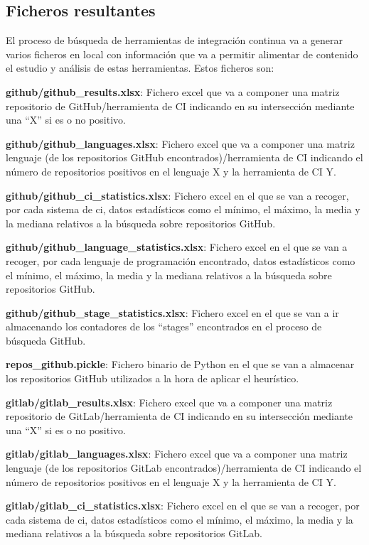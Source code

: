 \subsection{Ficheros resultantes}
El proceso de búsqueda de herramientas de integración continua va a generar varios ficheros en local con información que va a permitir alimentar de contenido el estudio y análisis de estas herramientas. Estos ficheros son:
\begin{compactitem}
    \item \textbf{github/github\_results.xlsx}: Fichero excel que va a componer una matriz repositorio de GitHub/herramienta de CI indicando en su intersección mediante una ``X'' si es o no positivo.
    \item \textbf{github/github\_languages.xlsx}: Fichero excel que va a componer una matriz lenguaje (de los repositorios GitHub encontrados)/herramienta de CI indicando el número de repositorios positivos en el lenguaje X y la herramienta de CI Y.
    \item \textbf{github/github\_ci\_statistics.xlsx}: Fichero excel en el que se van a recoger, por cada sistema de ci, datos estadísticos como el mínimo, el máximo, la media y la mediana relativos a la búsqueda sobre repositorios GitHub.
    \item \textbf{github/github\_language\_statistics.xlsx}: Fichero excel en el que se van a recoger, por cada lenguaje de programación encontrado, datos estadísticos como el mínimo, el máximo, la media y la mediana relativos a la búsqueda sobre repositorios GitHub.
    \item \textbf{github/github\_stage\_statistics.xlsx}: Fichero excel en el que se van a ir almacenando los contadores de los ``stages'' encontrados en el proceso de búsqueda GitHub.
    \item \textbf{repos\_github.pickle}: Fichero binario de Python en el que se van a almacenar los repositorios GitHub utilizados a la hora de aplicar el heurístico.
    \item \textbf{gitlab/gitlab\_results.xlsx}: Fichero excel que va a componer una matriz repositorio de GitLab/herramienta de CI indicando en su intersección mediante una ``X'' si es o no positivo.
    \item \textbf{gitlab/gitlab\_languages.xlsx}: Fichero excel que va a componer una matriz lenguaje (de los repositorios GitLab encontrados)/herramienta de CI indicando el número de repositorios positivos en el lenguaje X y la herramienta de CI Y.
    \item \textbf{gitlab/gitlab\_ci\_statistics.xlsx}: Fichero excel en el que se van a recoger, por cada sistema de ci, datos estadísticos como el mínimo, el máximo, la media y la mediana relativos a la búsqueda sobre repositorios GitLab.

\end{compactitem}
